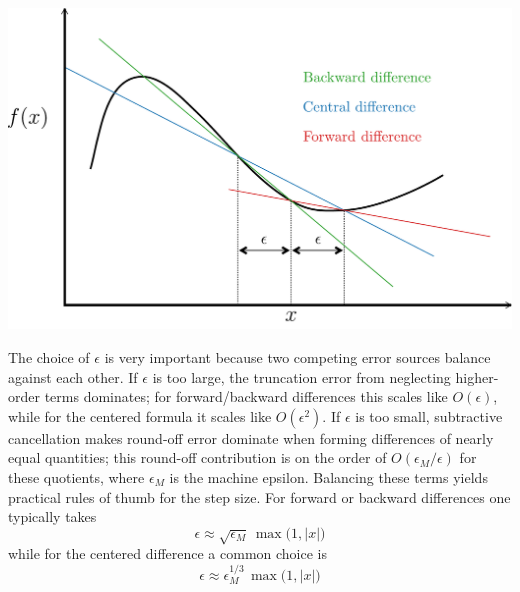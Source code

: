 \begin{center}
    \includegraphics[width=.5\textwidth]{figs/nle/difference_schemes.pdf}
\end{center}

The choice of \(\epsilon\) is very important because two competing error sources balance against each other. If \(\epsilon\) is too large, the truncation error from neglecting higher-order terms dominates; for forward/backward differences this scales like \(O(\epsilon)\), while for the centered formula it scales like \(O(\epsilon^2)\). If \(\epsilon\) is too small, subtractive cancellation makes round-off error dominate when forming differences of nearly equal quantities; this round-off contribution is on the order of \(O(\epsilon_M/\epsilon)\) for these quotients, where \(\epsilon_M\) is the machine epsilon. Balancing these terms yields practical rules of thumb for the step size. For forward or backward differences one typically takes
\[
  \epsilon \approx \sqrt{\epsilon_M}\,\max\!\bigl(1,\lvert x\rvert\bigr)
\]
while for the centered difference a common choice is
\[
  \epsilon \approx \epsilon_M^{1/3}\,\max\!\bigl(1,\lvert x\rvert\bigr)
\]

